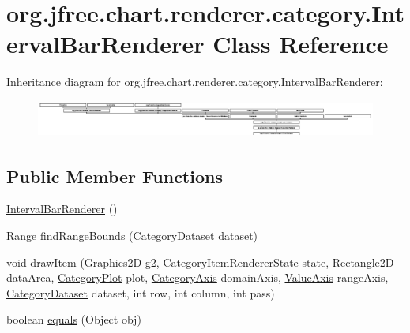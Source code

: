 \hypertarget{classorg_1_1jfree_1_1chart_1_1renderer_1_1category_1_1_interval_bar_renderer}{}\section{org.\+jfree.\+chart.\+renderer.\+category.\+Interval\+Bar\+Renderer Class Reference}
\label{classorg_1_1jfree_1_1chart_1_1renderer_1_1category_1_1_interval_bar_renderer}
Inheritance diagram for org.\+jfree.\+chart.\+renderer.\+category.\+Interval\+Bar\+Renderer\+:\begin{figure}[H]
\begin{center}
\leavevmode
\includegraphics[height=1.237113cm]{classorg_1_1jfree_1_1chart_1_1renderer_1_1category_1_1_interval_bar_renderer}
\end{center}
\end{figure}
\subsection*{Public Member Functions}
\begin{DoxyCompactItemize}
\item 
\mbox{\hyperlink{classorg_1_1jfree_1_1chart_1_1renderer_1_1category_1_1_interval_bar_renderer_aa68b5825f13e626277196e92e65802eb}{Interval\+Bar\+Renderer}} ()
\item 
\mbox{\hyperlink{classorg_1_1jfree_1_1data_1_1_range}{Range}} \mbox{\hyperlink{classorg_1_1jfree_1_1chart_1_1renderer_1_1category_1_1_interval_bar_renderer_a5b0123164b3c4c4e88b0e844d0503ed8}{find\+Range\+Bounds}} (\mbox{\hyperlink{interfaceorg_1_1jfree_1_1data_1_1category_1_1_category_dataset}{Category\+Dataset}} dataset)
\item 
void \mbox{\hyperlink{classorg_1_1jfree_1_1chart_1_1renderer_1_1category_1_1_interval_bar_renderer_ab9fc84f939fffdb564f42b2a941d0fa8}{draw\+Item}} (Graphics2D g2, \mbox{\hyperlink{classorg_1_1jfree_1_1chart_1_1renderer_1_1category_1_1_category_item_renderer_state}{Category\+Item\+Renderer\+State}} state, Rectangle2D data\+Area, \mbox{\hyperlink{classorg_1_1jfree_1_1chart_1_1plot_1_1_category_plot}{Category\+Plot}} plot, \mbox{\hyperlink{classorg_1_1jfree_1_1chart_1_1axis_1_1_category_axis}{Category\+Axis}} domain\+Axis, \mbox{\hyperlink{classorg_1_1jfree_1_1chart_1_1axis_1_1_value_axis}{Value\+Axis}} range\+Axis, \mbox{\hyperlink{interfaceorg_1_1jfree_1_1data_1_1category_1_1_category_dataset}{Category\+Dataset}} dataset, int row, int column, int pass)
\item 
boolean \mbox{\hyperlink{classorg_1_1jfree_1_1chart_1_1renderer_1_1category_1_1_interval_bar_renderer_adef5aad4d7c5c7c7b31e2653208f7b33}{equals}} (Object obj)
\end{DoxyCompactItemize}
